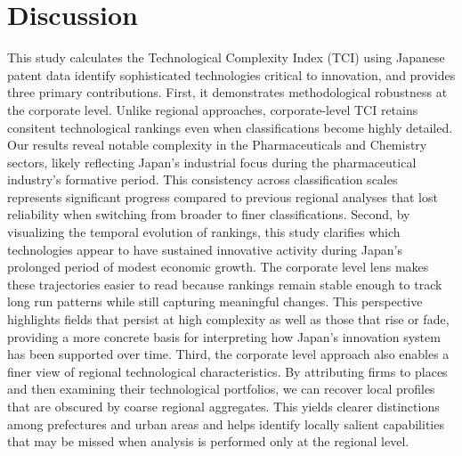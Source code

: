 \makeatletter
\def\@currentlabelname{Discussion}%
\makeatother
\label{section:Discussion}

\section*{Discussion}
{}
This study calculates the Technological Complexity Index (TCI) using Japanese patent data identify sophisticated technologies critical to innovation, and provides three primary contributions.
First, it demonstrates methodological robustness at the corporate level.
Unlike regional approaches, corporate-level TCI retains consitent technological rankings even when classifications become highly detailed.
Our results reveal notable complexity in the Pharmaceuticals and Chemistry sectors, likely reflecting Japan's industrial focus during the pharmaceutical industry's formative period.
This consistency across classification scales represents significant progress compared to previous regional analyses that lost reliability when switching from broader to finer classifications.
Second, by visualizing the temporal evolution of rankings, this study clarifies which technologies appear to have sustained innovative activity during Japan’s prolonged period of modest economic growth. The corporate level lens makes these trajectories easier to read because rankings remain stable enough to track long run patterns while still capturing meaningful changes. This perspective highlights fields that persist at high complexity as well as those that rise or fade, providing a more concrete basis for interpreting how Japan’s innovation system has been supported over time.
Third, the corporate level approach also enables a finer view of regional technological characteristics. By attributing firms to places and then examining their technological portfolios, we can recover local profiles that are obscured by coarse regional aggregates. This yields clearer distinctions among prefectures and urban areas and helps identify locally salient capabilities that may be missed when analysis is performed only at the regional level.

